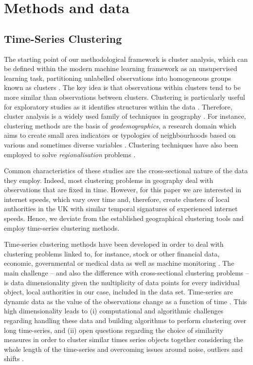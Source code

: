 \documentclass[,]{sagej}
\begin{document}
\hypertarget{sec:3}{%
\section{Methods and data}\label{sec:3}}

\hypertarget{sec:3.1}{%
\subsection{Time-Series Clustering}\label{sec:3.1}}

The starting point of our methodological framework is cluster analysis,
which can be defined within the modern machine learning framework as an
unsupervised learning task, partitioning unlabelled observations into
homogeneous groups known as clusters \citep{montero2014tsclust}. The key
idea is that observations within clusters tend to be more similar than
observations between clusters. Clustering is particularly useful for
exploratory studies as it identifies structures within the data
\citep{aghabozorgi2015time}. Therefore, cluster analysis is a widely
used family of techniques in geography
\citep{gordon1977classification, everitt1974cluster}. For instance,
clustering methods are the basis of \emph{geodemographics}, a research
domain which aims to create small area indicators or typologies of
neighbourhoods based on various and sometimes diverse variables
\citep{SINGLETON2009289, harris2005geodemographics}. Clustering
techniques have also been employed to solve \emph{regionalisation}
problems \citep{niesterowicz2016}.

Common characteristics of these studies are the cross-sectional nature
of the data they employ. Indeed, most clustering problems in geography
deal with observations that are fixed in time. However, for this paper
we are interested in internet speeds, which vary over time and,
therefore, create clusters of local authorities in the UK with similar
temporal signatures of experienced internet speeds. Hence, we deviate
from the established geographical clustering tools and employ
time-series clustering methods.

Time-series clustering methods have been developed in order to deal with
clustering problems linked to, for instance, stock or other financial
data, economic, governmental or medical data as well as machine
monitoring
\citep{aggarwal2013time, aggarwal2001surprising, hyndman2015large, WARRENLIAO20051857}.
The main challenge -- and also the difference with cross-sectional
clustering problems -- is data dimensionality given the multiplicity of
data points for every individual object, local authorities in our case,
included in the data set. Time-series are dynamic data as the value of
the observations change as a function of time
\citep{aghabozorgi2015time}. This high dimensionality leads to (i)
computational and algorithmic challenges regarding handling these data
and building algorithms to perform clustering over long time-series, and
(ii) open questions regarding the choice of similarity measures in order
to cluster similar times series objects together considering the whole
length of the time-series and overcoming issues around noise, outliers
and shifts \citep{lin2004iterative, aghabozorgi2015time}.
\end{document}
